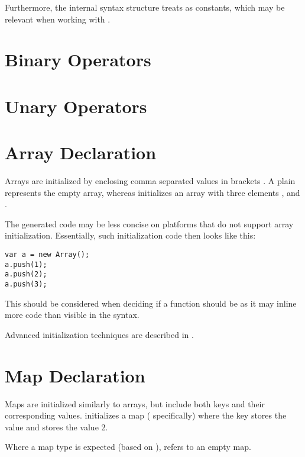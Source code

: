 Furthermore, the internal syntax structure treats  as constants, which may be relevant when working with .


\section{Binary Operators}
\label{expression-binops}

\section{Unary Operators}
\label{expression-unops}

\section{Array Declaration}
\label{expression-array-declaration}

Arrays are initialized by enclosing comma \expr{,} separated values in brackets \expr{[]}. A plain \expr{[]} represents the empty array, whereas \expr{[1, 2, 3]} initializes an array with three elements ,  and .

The generated code may be less concise on platforms that do not support array initialization. Essentially, such initialization code then looks like this:

\begin{lstlisting}
var a = new Array();
a.push(1);
a.push(2);
a.push(3);
\end{lstlisting}
This should be considered when deciding if a function should be  as it may inline more code than visible in the syntax.

Advanced initialization techniques are described in .

\section{Map Declaration}
\label{expression-map-declaration}

Maps are initialized similarly to arrays, but include both keys and their corresponding values. \expr{["example" => 1, "data" => 2]} initializes a map ( specifically) where the key  stores the value  and  stores the value 2.


Where a map type is expected (based on ), \expr{[]} refers to an empty map.


